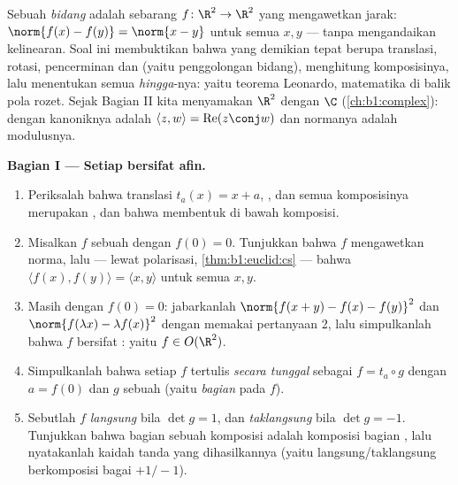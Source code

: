 \begin{problem}\label{pb:b1:euclid:1}
Sebuah \emph{ bidang} adalah sebarang  $f \colon \R^2 \to
\R^2$ yang mengawetkan jarak: $\norm{f(x) - f(y)} = \norm{x - y}$
untuk semua $x, y$ --- tanpa mengandaikan kelinearan. Soal ini membuktikan
bahwa  yang demikian tepat berupa translasi, rotasi,
pencerminan dan  (yaitu penggolongan 
bidang), menghitung komposisinya, lalu menentukan semua
 \emph{hingga}-nya: yaitu teorema Leonardo, matematika
di balik pola rozet. Sejak Bagian II kita menyamakan $\R^2$ dengan
$\C$ (\cref{ch:b1:complex}): dengan  kanoniknya adalah
$\langle z, w\rangle = \operatorname{Re}(z\conj w)$ dan normanya
adalah modulusnya.

\medskip
\noindent\textbf{Bagian I --- Setiap  bersifat afin.}
\begin{enumerate}
  \item Periksalah bahwa translasi $t_a(x) = x + a$, 
        , dan semua komposisinya merupakan ,
        dan bahwa  membentuk  di bawah komposisi.
  \item Misalkan $f$ sebuah  dengan $f(0) = 0$. Tunjukkan bahwa $f$
        mengawetkan norma, lalu --- lewat polarisasi,
        \cref{thm:b1:euclid:cs} --- bahwa $\langle f(x),
        f(y)\rangle = \langle x, y\rangle$ untuk semua $x, y$.
  \item Masih dengan $f(0) = 0$: jabarkanlah $\norm{f(x + y) - f(x) -
        f(y)}^2$ dan $\norm{f(\lambda x) - \lambda f(x)}^2$
        dengan memakai pertanyaan 2, lalu simpulkanlah bahwa $f$ bersifat
        \emph{}: yaitu $f \in O(\R^2)$.
  \item Simpulkanlah bahwa setiap  $f$ tertulis \emph{secara tunggal} sebagai
        $f = t_a \circ g$ dengan $a = f(0)$ dan $g$ sebuah 
         (yaitu \emph{bagian } pada $f$).
  \item Sebutlah $f$ \emph{langsung} bila $\det g = 1$, dan \emph{taklangsung}
        bila $\det g = -1$. Tunjukkan bahwa bagian  sebuah
        komposisi adalah komposisi bagian , lalu
        nyatakanlah kaidah tanda yang dihasilkannya
        (yaitu langsung/taklangsung berkomposisi bagai $+1/-1$).
\end{enumerate}


\end{problem}
